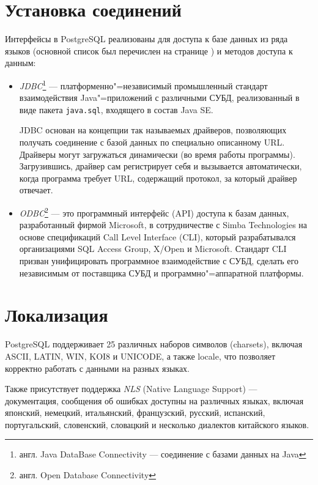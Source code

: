 \documentclass[a4paper,12pt,notitlepage,headsepline,pdftex]{scrartcl}
\begin{document}
\section{Установка соединений}
  Интерфейсы в PostgreSQL реализованы для доступа к базе данных из ряда языков
  (основной список был перечислен на странице \pageref{p:langs}) и методов
  доступа к данным:
  \begin{itemize}
    \item \emph{JDBC}\footnote{англ. Java DataBase Connectivity --- соединение
      с базами данных на Java} --- платформенно"=независимый промышленный
      стандарт взаимодействия Java"=приложений с различными СУБД,
      реализованный в виде пакета \verb'java.sql', входящего в состав Java SE.

      JDBC основан на концепции так называемых драйверов, позволяющих получать
      соединение с базой данных по специально описанному URL.
      Драйверы могут загружаться динамически (во время работы программы).
      Загрузившись, драйвер сам регистрирует себя и вызывается автоматически,
      когда программа требует URL, содержащий протокол, за который драйвер
      отвечает.
    \item \emph{ODBC}\footnote{англ. Open Database Connectivity} --- это
      программный интерфейс (API) доступа к базам данных, разработанный фирмой
      Microsoft, в сотрудничестве с Simba Technologies на основе спецификаций
      Call Level Interface (CLI), который разрабатывался организациями SQL
      Access Group, X/Open и Microsoft.
      Стандарт CLI призван унифицировать программное взаимодействие с СУБД,
      сделать его независимым от поставщика СУБД и программно"=аппаратной
      платформы.
  \end{itemize}
  \pagebreak
\section{Локализация}
  PostgreSQL поддерживает 25 различных наборов символов (charsets), включая
  ASCII, LATIN, WIN, KOI8 и UNICODE, а также locale, что позволяет корректно
  работать с данными на разных языках.

  Также присутствует поддержка \emph{NLS} (Native Language Support) ---
  документация, сообщения об ошибках доступны на различных языках, включая
  японский, немецкий, итальянский, французский, русский, испанский,
  португальский, словенский, словацкий и несколько диалектов китайского
  языков.
  \pagebreak
\end{document}

